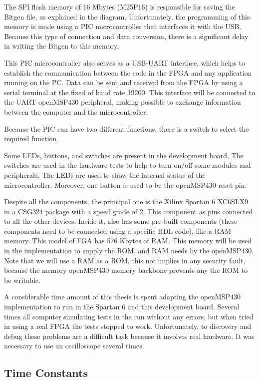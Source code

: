 The SPI flash memory of 16 Mbytes (M25P16) is responsible for saving the Bitgen file, as explained in the diagram. Unfortunately, the programming of this memory is made using a PIC microcontroller that interfaces it with the USB. Because this type of connection and data conversion, there is a significant delay in writing the Bitgen to this memory. 

This PIC microcontroller also serves as a USB-UART interface, which helps to establish the communication between the code in the FPGA and any application running on the PC. Data can be sent and received from the FPGA by using a serial terminal at the fixed of baud rate 19200. This interface will be connected to the UART openMSP430 peripheral, making possible to exchange information between the computer and the microcontroller.

Because the PIC can have two different functions, there is a switch to select the required function.

Some LEDs, buttons, and switches are present in the development board. The switches are used in the hardware tests to help to turn on/off some modules and peripherals. The LEDs are used to show the internal status of the microcontroller. Moreover, one button is used to be the openMSP430 reset pin.

Despite all the components, the principal one is the Xilinx Spartan 6 XC6SLX9 in a CSG324 package with a speed grade of 2. This component as pins connected to all the other devices. Inside it, also has some pre-built components (these components need to be connected using a specific HDL code), like a RAM memory. This model of FGA has 576 Kbytes of RAM. This memory will be used in the implementation to supply the ROM, and RAM needs by the openMSP430. Note that we will use a RAM as a ROM, this not implies in any security fault, because the memory openMSP430 memory backbone prevents any the ROM to be writable.

A considerable time amount of this thesis is spent adapting the openMSP430 implementation to run in the Spartan 6 and this development board. Several times all computer simulating tests in the run without any errors, but when tried in using a real FPGA the tests stopped to work. Unfortunately, to discovery and debug these problems are a difficult task because it involves real hardware. It was necessary to use an oscilloscope several times.

\subsection{Time Constants}

